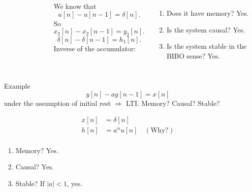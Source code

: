 \begin{frame}[plain]


    {
        \begin{columns}
                \begin{figure}
                  \centering
                  
                  \caption{}\label{fi:accumulator_inverse}
                \end{figure}
                We know that
                \begin{equation*}
                    u[n] - u[n-1] = \delta[n].
                \end{equation*}
                So
                \begin{equation*}
                    x_2[n] - x_2[n-1] = y_2[n].
                \end{equation*}
                \begin{equation*}
                    \delta[n] - \delta[n-1] = h_1[n].
                \end{equation*}
            \noindent Inverse of the accumulator:
            \begin{enumerate}
              \item Does it have memory? Yes.
              \item Is the system causal? Yes.
              \item Is the system stable in the BIBO sense? Yes.
            \end{enumerate}

        \end{columns}
    }
\end{frame}


\begin{frame}{Example}
    \begin{equation*}
        y[n] - ay[n-1] = x[n]
    \end{equation*}
    under the assumption of initial rest $\Rightarrow$ LTI.
    Memory? Causal? Stable?
    \pause
    {
        \begin{align*}
          x[n] &= \delta[n] \\
          h[n] &= a^nu[n] \quad (\text{Why?})\\
        \end{align*}
        \pause
            \begin{enumerate}
              \item Memory? Yes.
              \item Causal? Yes.
              \item Stable? If $|a|<1$, yes.
            \end{enumerate}
    }
\end{frame}

